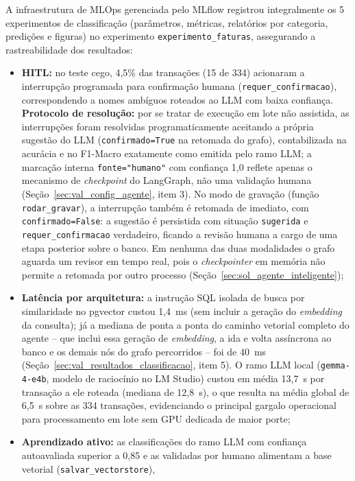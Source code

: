 A infraestrutura de MLOps gerenciada pelo MLflow \cite{zaharia2018mlflow} registrou integralmente os
5 experimentos de classificação
(parâmetros, métricas, relatórios por categoria, predições e figuras) no experimento
\texttt{experimento\_faturas}, assegurando a rastreabilidade dos resultados:
\begin{itemize}
	\item \textbf{HITL:} no teste cego, 4,5\% das transações (15 de 334) acionaram a interrupção programada para confirmação humana (\texttt{requer\_confirmacao}), correspondendo a nomes ambíguos roteados ao LLM com baixa confiança. \textbf{Protocolo de resolução:} por se tratar de execução em lote não assistida, as interrupções foram resolvidas programaticamente aceitando a própria sugestão do LLM (\texttt{confirmado=True} na retomada do grafo), contabilizada na acurácia e no F1-Macro exatamente como emitida pelo ramo LLM; a marcação interna \texttt{fonte="humano"} com confiança 1,0 reflete apenas o mecanismo de \textit{checkpoint} do LangGraph, não uma validação humana (Seção~\ref{sec:val_config_agente}, item 3). No modo de gravação (função \texttt{rodar\_gravar}), a interrupção também é retomada de imediato, com \texttt{confirmado=False}: a sugestão é persistida com situação \texttt{sugerida} e \texttt{requer\_confirmacao} verdadeiro, ficando a revisão humana a cargo de uma etapa posterior sobre o banco. Em nenhuma das duas modalidades o grafo aguarda um revisor em tempo real, pois o \textit{checkpointer} em memória não permite a retomada por outro processo (Seção~\ref{sec:sol_agente_inteligente});
	\item \textbf{Latência por arquitetura:} a instrução SQL isolada de busca por similaridade no pgvector custou
	1,4~ms (sem incluir a geração do \textit{embedding} da consulta); já a mediana de ponta a ponta do caminho vetorial completo do agente -- que inclui essa geração de \textit{embedding}, a ida e volta assíncrona ao banco e os demais nós do grafo percorridos -- foi de 40~ms (Seção~\ref{sec:val_resultados_classificacao}, item 5). O ramo LLM local (\texttt{gemma-4-e4b}, modelo de
	raciocínio no LM Studio) custou em média 13,7~s por transação a ele roteada (mediana de 12,8~s), o que resulta na média global de 6,5~s sobre as 334 transações, evidenciando o principal gargalo operacional para processamento em lote sem
	GPU dedicada de maior porte;
	\item \textbf{Aprendizado ativo:} as classificações do ramo LLM com confiança autoavaliada superior a 0,85 e
	as validadas por humano alimentam a base vetorial (\texttt{salvar\_vectorstore}),

\end{itemize}
